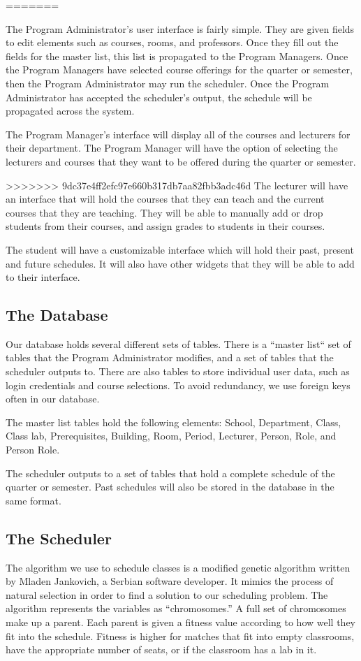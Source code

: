 \documentclass[12pt]{article}
\begin{document}
\begin{enumerate}
\begin{enumerate}
=======

The Program Administrator's user interface is fairly simple. They are given fields to edit elements such as courses, rooms, and professors. Once they fill out the fields for the master list, this list is propagated to the Program Managers. Once the Program Managers have selected course offerings for the quarter or semester, then the Program Administrator may run the scheduler. Once the Program Administrator has accepted the scheduler's output, the schedule will be propagated across the system.

The Program Manager's interface will display all of the courses and lecturers for their department. The Program Manager will have the option of selecting the lecturers and courses that they want to be offered during the quarter or semester.

>>>>>>> 9dc37e4ff2efc97e660b317db7aa82fbb3adc46d
The lecturer will have an interface that will hold the courses that they can teach and the current courses that they are teaching. They will be able to manually add or drop students from their courses, and assign grades to students in their courses.

The student will have a customizable interface which will hold their past, present and future schedules. It will also have other widgets that they will be able to add to their interface.

\subsection{The Database}
Our database holds several different sets of tables. There is a ``master list`` set of tables that the Program Administrator modifies, and a set of tables that the scheduler outputs to. There are also tables to store individual user data, such as login credentials and course selections. To avoid redundancy, we use foreign keys often in our database.

The master list tables hold the following elements: School, Department, Class, Class lab, Prerequisites, Building, Room, Period, Lecturer, Person, Role, and Person Role.

The scheduler outputs to a set of tables that hold a complete schedule of the quarter or semester. Past schedules will also be stored in the database in the same format. 


\subsection{The Scheduler}
The algorithm we use to schedule classes is a modified genetic algorithm written by Mladen Jankovich, a Serbian software developer. It mimics the process of natural selection in order to find a solution to our scheduling problem. The algorithm represents the variables as ``chromosomes.'' A full set of chromosomes make up a parent. Each parent is given a fitness value according to how well they fit into the schedule. Fitness is higher for matches that fit into empty classrooms, have the appropriate number of seats, or if the classroom has a lab in it. 


\end{enumerate}
\end{enumerate}
\end{document}
